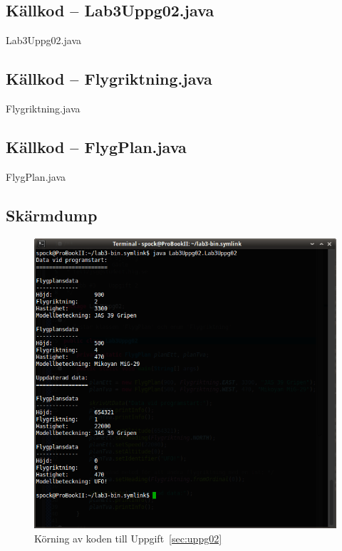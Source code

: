 \subsection{Källkod -- Lab3Uppg02.java}
\caption{Lab3Uppg02.java}
\label{src:uppg02}

\subsection{Källkod -- Flygriktning.java}
\caption{Flygriktning.java}
\label{src:flygriktning}

\subsection{Källkod -- FlygPlan.java}
\caption{FlygPlan.java}
\label{src:flygplan}


\subsection{Skärmdump}
\begin{figure}[htbp]
    \centering
        \includegraphics[width=\linewidth]{img/02.png}
    \caption{Körning av koden till Uppgift~\ref{sec:uppg02}}
    \label{fig:uppg02-screenshot}
\end{figure}

